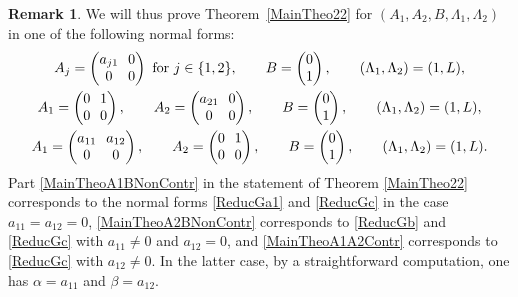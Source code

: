 \documentclass[10pt]{article}
\theoremstyle{plain}
\theoremstyle{definition}
\newtheorem{remk}[theo]{Remark}
\numberwithin{equation}{section}\numberwithin{figure}{section}\emergencystretch=3em
\begin{document}
\begin{remk}
We will thus prove Theorem~\ref{MainTheo22} for $(A_1, A_2, B, \Lambda_1, \Lambda_2) $ in one of the following normal forms:
\begin{gather}
\label{ReducGa1}\arraycolsep3.5pt
A_j = \begin{pmatrix}
a_{j1} & 0 \\
0 & 0 \\
\end{pmatrix} \text{ for } j \in \{1, 2\}, \qquad B = \begin{pmatrix}
0 \\
1 \\
\end{pmatrix}, \qquad (\Lambda_1, \Lambda_2) = (1, L),
\\
\label{ReducGb}\arraycolsep3.5pt
A_1 = \begin{pmatrix}
0 & 1 \\
0 & 0 \\
\end{pmatrix}, \qquad A_2 = \begin{pmatrix}
a_{21} & 0 \\
0 & 0 \\
\end{pmatrix}, \qquad B = \begin{pmatrix}
0 \\
1 \\
\end{pmatrix}, \qquad (\Lambda_1, \Lambda_2) = (1, L),
\\
\label{ReducGc}\arraycolsep3.5pt
A_1 = \begin{pmatrix}
a_{11} & a_{12} \\
0 & 0 \\
\end{pmatrix}, \qquad A_2 = \begin{pmatrix}
0 & 1 \\
0 & 0 \\
\end{pmatrix}, \qquad B = \begin{pmatrix}
0 \\
1 \\
\end{pmatrix}, \qquad (\Lambda_1, \Lambda_2) = (1, L).
\end{gather}
Part \eqref{MainTheoA1BNonContr} in the statement of Theorem \ref{MainTheo22} corresponds to the normal forms \eqref{ReducGa1} and \eqref{ReducGc} in the case $a_{11} = a_{12} = 0$, \eqref{MainTheoA2BNonContr} corresponds to \eqref{ReducGb} and \eqref{ReducGc} with $a_{11} \neq 0$ and $a_{12} = 0$, and \eqref{MainTheoA1A2Contr} corresponds to \eqref{ReducGc} with $a_{12} \neq 0$. In the latter case, by a straightforward computation, one has $\alpha = a_{11}$ and $\beta = a_{12}$.
\end{remk}
\end{document}
